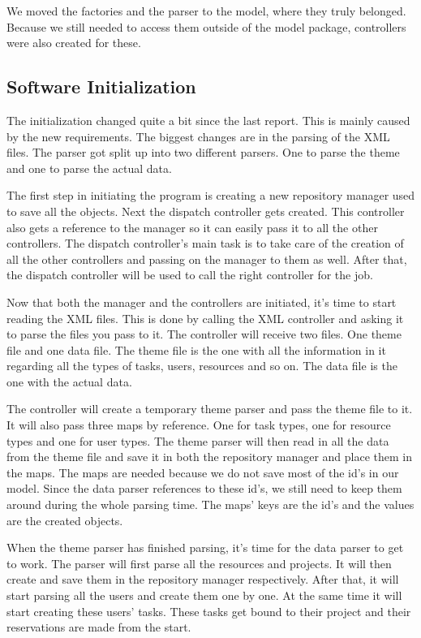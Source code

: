 			We moved the factories and the parser to the model, where they truly belonged. Because we still needed to access them outside of the model package, controllers were also created for these.
		\subsection{Software Initialization}
			The initialization changed quite a bit since the last report. This is mainly caused by the new requirements. The biggest changes are in the parsing of the XML files. The parser got split up into two different parsers. One to parse the theme and one to parse the actual data.
			
			The first step in initiating the program is creating a new repository manager used to save all the objects. Next the dispatch controller gets created. This controller also gets a reference to the manager so it can easily pass it to all the other controllers. The dispatch controller's main task is to take care of the creation of all the other controllers and passing on the manager to them as well. After that, the dispatch controller will be used to call the right controller for the job.
			
			Now that both the manager and the controllers are initiated, it's time to start reading the XML files. This is done by calling the XML controller and asking it to parse the files you pass to it. The controller will receive two files. One theme file and one data file. The theme file is the one with all the information in it regarding all the types of tasks, users, resources and so on. The data file is the one with the actual data.
			
			The controller will create a temporary theme parser and pass the theme file to it. It will also pass three maps by reference. One for task types, one for resource types and one for user types. The theme parser will then read in all the data from the theme file and save it in both the repository manager and place them in the maps. The maps are needed because we do not save most of the id's in our model. Since the data parser references to these id's, we still need to keep them around during the whole parsing time. The maps' keys are the id's and the values are the created objects.
			
			When the theme parser has finished parsing, it's time for the data parser to get to work. The parser will first parse all the resources and projects. It will then create and save them in the repository manager respectively. After that, it will start parsing all the users and create them one by one. At the same time it will start creating these users' tasks. These tasks get bound to their project and their reservations are made from the start. 
			
